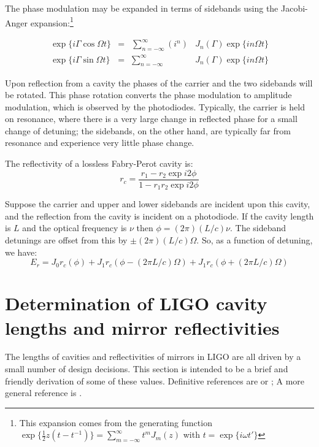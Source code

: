 The phase modulation may be expanded in terms of sidebands using the
Jacobi-Anger expansion:\footnote{This expansion comes from the 
generating function 
$\exp\{\frac{1}{2} z \left(t - t^{-1}\right)\} = \sum_{m=-\infty}^\infty t^m J_m(z)$ with $t = \exp \{i \omega t'\}$}

\begin{equation}
\begin{array}{rcll}
\exp\{i\Gamma\cos\Omega t\} & = &\sum_{n=-\infty}^{\infty} \left(i^n\right) & J_n(\Gamma) \exp\{i n \Omega t\} \\
\exp\{i\Gamma\sin\Omega t\} & = & \sum_{n=-\infty}^{\infty} & J_n(\Gamma) \exp\{i n \Omega t\}
\end{array}
\end{equation}

Upon reflection from a cavity the phases of the carrier and the two
sidebands will be rotated.  This phase rotation converts the phase
modulation to amplitude modulation, which is observed by the
photodiodes.  Typically, the carrier is held on resonance, where there
is a very large change in reflected phase for a small change of
detuning; the sidebands, on the other hand, are typically far from
resonance and experience very little phase change.

The reflectivity of a lossless Fabry-Perot cavity is:
\begin{equation}
r_c = \frac{r_1 - r_2 \exp i2\phi}{1 - r_1 r_2 \exp i 2\phi}
\end{equation}

Suppose the carrier and upper and lower sidebands are incident upon this
cavity, and the reflection from the cavity is incident on a photodiode.
If the cavity length is $L$ and the optical frequency is $\nu$ then
$\phi = (2\pi)(L/c)\nu$.  The sideband detunings are offset from this by
$\pm(2\pi)(L/c)\Omega$.  So, as a function of detuning, we have:
%
\begin{equation}
E_r = J_0 r_c(\phi) 
+ J_1 r_c(\phi - (2\pi L/c)\Omega) 
+ J_1 r_c(\phi + (2\pi L/c)\Omega)
\end{equation}


\section{Determination of LIGO cavity lengths and mirror reflectivities}

The lengths of cavities and reflectivities of mirrors in LIGO are all
driven by a small number of design decisions.  This section is
intended to be a brief and friendly derivation of some of these
values.  Definitive references are \cite{LigoFreqResponse97} or
\cite{Fritschel2001Readout}; A more general reference is
\cite{S5InstrumentPaper}.

